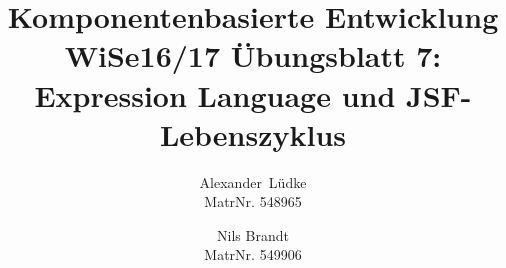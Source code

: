 \documentclass[a4paper,letterpaper,10pt,ngerman]{scrartcl}
\begin{document}
%
%

\date{}

\title{\Large \bf Komponentenbasierte Entwicklung WiSe16/17 Übungsblatt 7: Expression Language und JSF-Lebenszyklus}

\author{
{\rm Alexander\ Lüdke}\\
MatrNr. 548965
\and
{\rm Nils Brandt}\\
MatrNr. 549906
}

\maketitle

\thispagestyle{empty}
\end{document}
